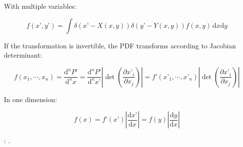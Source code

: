 With multiple variables:

\begin{equation}
	f(x’, y’) = \int {\delta(x’ - X(x, y)) \delta(y’ - Y(x, y)) f(x, y)} \,\mathrm{d}x \mathrm{d}y
\end{equation}

If the transformation is invertible, the PDF transforms according to Jacobian determinant:

\begin{equation}
	f(x_{1}, \cdots, x_{n}) = \frac{\mathrm{d}^{n}P’}{\mathrm{d}^{n}x} 
	= \frac{\mathrm{d}^{n}P’}{\mathrm{d}^{n}x’} \left| \det \left(\frac{\partial x’_{i}}{\partial x_{j}} \right) \right|
	= f’(x’_{1}, \cdots, x’_{n}) \left| \det \left(\frac{\partial x’_{i}}{\partial x_{j}} \right) \right|
\end{equation}

In one dimension:

\begin{equation}
	f(x) = f’(x’) \left| \frac{\mathrm{d}x’}{\mathrm{d}x}\right|
	= f(y) \left| \frac{\mathrm{d}y}{\mathrm{d}x}\right|
\end{equation}

: .
